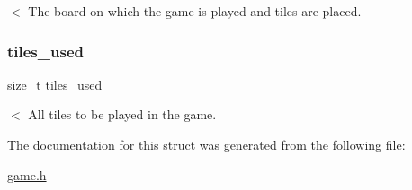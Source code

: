 $<$ The board on which the game is played and tiles are placed. \hypertarget{structgame_a3ba14fb93302c82593ca2865b69718cb}{}\label{structgame_a3ba14fb93302c82593ca2865b69718cb} 
\subsubsection{\texorpdfstring{tiles\+\_\+used}{tiles\_used}}
{\footnotesize\ttfamily size\+\_\+t tiles\+\_\+used}

$<$ All tiles to be played in the game. 

The documentation for this struct was generated from the following file\+:\begin{DoxyCompactItemize}
\item 
\hyperlink{game_8h}{game.\+h}\end{DoxyCompactItemize}
